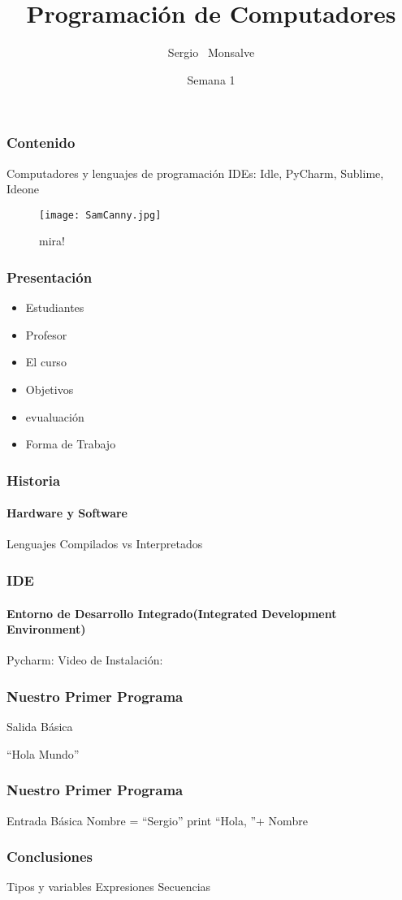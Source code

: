 \documentclass{beamer}
\title[ProgComp] %
      {Programación de Computadores}
\author%
             {Sergio ~Monsalve\inst{1}} %
\institute%
                       {
                         \inst{1}%
                         Ingeniería de Sistemas\\
                         Departamento de Informatica\\
                         Universidad EAFIT
                       }
\date[\today] %
                            {Semana 1}
\begin{document}
                            
\frame{\titlepage}


\begin{frame}
  \frametitle{Contenido}
  Computadores y lenguajes de programación
  IDEs: Idle, PyCharm, Sublime, Ideone

  \begin{figure}[p]
    \centering
    \texttt{[image: SamCanny.jpg]}
  \caption{mira!}
  \end{figure}
  
\end{frame}

\begin{frame}
  \frametitle{Presentación}
  \begin{itemize}
  \item Estudiantes
  \item Profesor
  \item El curso
  \item Objetivos
  \item evualuación
  \item Forma de Trabajo
  \end{itemize}
\end{frame}

\begin{frame}
  \frametitle{Historia}
  \framesubtitle{Hardware y Software}
    Lenguajes Compilados vs Interpretados
\end{frame}

\begin{frame}
  \frametitle{IDE}
  \framesubtitle{Entorno de Desarrollo Integrado(Integrated Development Environment)}
    Pycharm: Video de Instalación:
\end{frame}


\begin{frame}
  \frametitle{Nuestro Primer Programa}
  Salida Básica

  ``Hola Mundo''
\end{frame}

\begin{frame}
  \frametitle{Nuestro Primer Programa}
  Entrada Básica
  Nombre = ``Sergio''
  print ``Hola, ''+ Nombre
\end{frame}

\begin{frame}
  \frametitle{Conclusiones}
    Tipos y variables
    Expresiones
    Secuencias
\end{frame}
\end{document}
